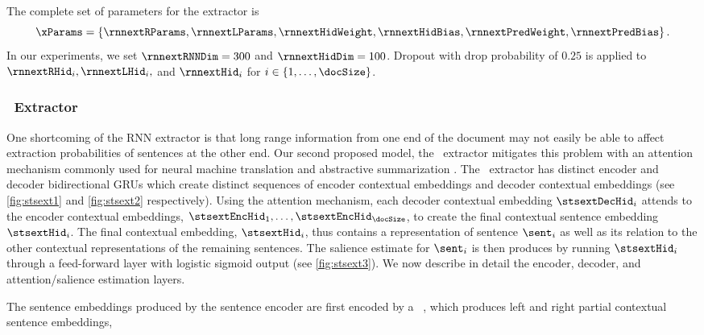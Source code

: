 The complete set of parameters for the extractor is 
\[ \xParams = \left\{\rnnextRParams, \rnnextLParams, \rnnextHidWeight, \rnnextHidBias, \rnnextPredWeight, \rnnextPredBias \right\}.\]
In our experiments, we set $\rnnextRNNDim=300$ and $\rnnextHidDim=100$.
Dropout with drop probability of $0.25$ is applied to $\rnnextRHid_i,
\rnnextLHid_i,$ and $\rnnextHid_i$ for $i \in \{1,\ldots,\docSize\}$.

\FloatBarrier

\subsubsection{\sts~Extractor} 

One shortcoming of the RNN extractor is that long range information from one
end of the document may not easily be able to affect extraction probabilities
of sentences at the other end.  Our second proposed model, the \sts~extractor
mitigates this problem with an attention mechanism commonly used for neural
machine translation \citep{bahdanau2015,luong2015} and abstractive
summarization \citep{see2017}. The \sts~extractor has distinct encoder and
decoder bidirectional GRUs  which create distinct sequences of encoder
contextual embeddings and decoder contextual embeddings (see
\autoref{fig:stsext1} and \autoref{fig:stsext2} respectively).  Using the
attention mechanism, each decoder contextual embedding $\stsextDecHid_i$
attends to the encoder contextual embeddings,
$\stsextEncHid_1,\ldots,\stsextEncHid_\docSize$, to create the final contextual
sentence embedding $\stsextHid_i$. The final contextual embedding,
$\stsextHid_i$, thus contains a representation of sentence $\sent_i$ as well as
its relation to the other contextual representations of the remaining
sentences.  The salience estimate for $\sent_i$ is then produces by running
$\stsextHid_i$ through a feed-forward layer with logistic sigmoid output (see
\autoref{fig:stsext3}). We now describe in detail the encoder, decoder, and
attention/salience estimation layers.

The sentence embeddings produced by the sentence encoder are first encoded by a
\bidirectional~\gru, which produces left and right partial contextual sentence
embeddings, \\



